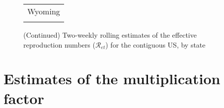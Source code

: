 \documentclass[12pt]{article}
\begin{document}
\begin{figure}[!th]%
\caption
{(Continued) Two-weekly rolling estimates of the effective reproduction numbers ($\mathcal
{R}_{et}$) for the contiguous US, by state}%
\vspace{-0.3cm}%


\begin{center}%
\hspace*{-0.2cm}%
\begin{tabular}
[c]{c}%
{\footnotesize Wyoming}\\%
{\includegraphics[
height=1.7763in,
width=3.5293in
]%
{figs/US-Re-WY-2W.png}%
}
\end{tabular}



\end{center}

%

\end{figure}%
%

\FloatBarrier


\section{Estimates of the multiplication factor\label{Sup: empirical_MF}}
\end{document}
